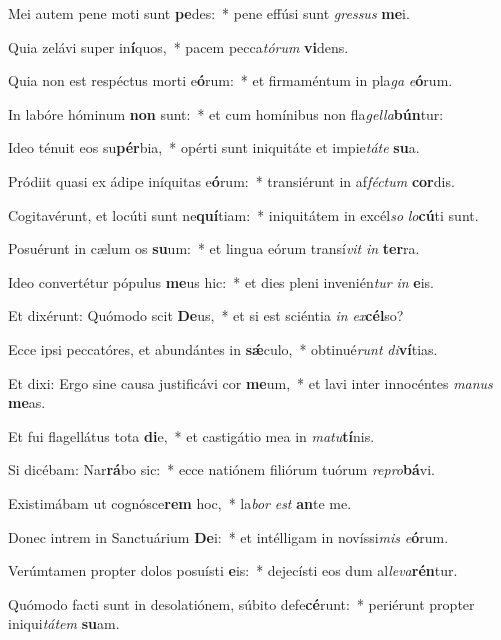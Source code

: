 \item Mei autem pene moti sunt \textbf{pe}des:~* pene effúsi sunt \textit{gres}\textit{sus} \textbf{me}i.
\item Quia zelávi super in\textbf{í}quos,~* pacem pecca\textit{tó}\textit{rum} \textbf{vi}dens.
\item Quia non est respéctus morti e\textbf{ó}rum:~* et firmaméntum in pla\textit{ga} \textit{e}\textbf{ó}rum.
\item In labóre hóminum \textbf{non} sunt:~* et cum homínibus non fla\textit{gel}\textit{la}\textbf{bún}tur:
\item Ideo ténuit eos su\textbf{pér}bia,~* opérti sunt iniquitáte et impie\textit{tá}\textit{te} \textbf{su}a.
\item Pródiit quasi ex ádipe iníquitas e\textbf{ó}rum:~* transiérunt in af\textit{féc}\textit{tum} \textbf{cor}dis.
\item Cogitavérunt, et locúti sunt ne\textbf{quí}tiam:~* iniquitátem in excél\textit{so} \textit{lo}\textbf{cú}ti sunt.
\item Posuérunt in cælum os \textbf{su}um:~* et lingua eórum transí\textit{vit} \textit{in} \textbf{ter}ra.
\item Ideo convertétur pópulus \textbf{me}us hic:~* et dies pleni invenién\textit{tur} \textit{in} \textbf{e}is.
\item Et dixérunt: Quómodo scit \textbf{De}us,~* et si est sciéntia \textit{in} \textit{ex}\textbf{cél}so?
\item Ecce ipsi peccatóres, et abundántes in \textbf{sǽ}culo,~* obtinué\textit{runt} \textit{di}\textbf{ví}tias.
\item Et dixi: Ergo sine causa justificávi cor \textbf{me}um,~* et lavi inter innocéntes \textit{ma}\textit{nus} \textbf{me}as.
\item Et fui flagellátus tota \textbf{di}e,~* et castigátio mea in \textit{ma}\textit{tu}\textbf{tí}nis.
\item Si dicébam: Nar\textbf{rá}bo sic:~* ecce natiónem filiórum tuórum \textit{re}\textit{pro}\textbf{bá}vi.
\item Existimábam ut cognósce\textbf{rem} hoc,~* la\textit{bor} \textit{est} \textbf{an}te me.
\item Donec intrem in Sanctuárium \textbf{De}i:~* et intélligam in novíssi\textit{mis} \textit{e}\textbf{ó}rum.
\item Verúmtamen propter dolos posuísti \textbf{e}is:~* dejecísti eos dum al\textit{le}\textit{va}\textbf{rén}tur.
\item Quómodo facti sunt in desolatiónem, súbito defe\textbf{cé}runt:~* periérunt propter iniqui\textit{tá}\textit{tem} \textbf{su}am.
